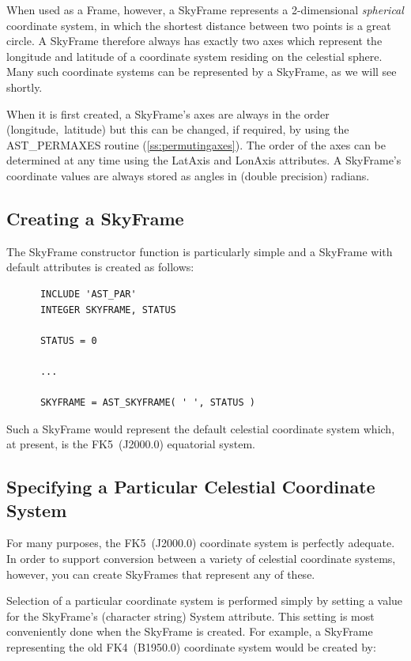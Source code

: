 \documentclass[twoside,11pt]{article}
\newcommand{\htmlref}[2]{#1}
\newcommand{\secref}[1]{\S\ref{#1}}
\renewcommand{\secref}[1]{\ref{#1}}
\begin{document}
When used as a Frame, however, a SkyFrame represents a 2-dimensional
{\em{spherical}} coordinate system, in which the shortest distance
between two points is a great circle.  A SkyFrame therefore always has
exactly two axes which represent the longitude and latitude of a
coordinate system residing on the celestial sphere. Many such
coordinate systems can be represented by a SkyFrame, as we will see
shortly.

When it is first created, a SkyFrame's axes are always in the order
(longitude,~latitude) but this can be changed, if required, by using the
\htmlref{AST\_PERMAXES}{AST_PERMAXES} routine (\secref{ss:permutingaxes}). The order of the axes
can be determined at any time using the \htmlref{LatAxis}{LatAxis} and \htmlref{LonAxis}{LonAxis} attributes. A
SkyFrame's coordinate values are always stored as angles in (double
precision) radians.

\subsection{Creating a SkyFrame}

The \htmlref{SkyFrame}{SkyFrame} constructor function is particularly simple and a
SkyFrame with default attributes is created as follows:

\small
\begin{verbatim}
      INCLUDE 'AST_PAR'
      INTEGER SKYFRAME, STATUS

      STATUS = 0

      ...

      SKYFRAME = AST_SKYFRAME( ' ', STATUS )
\end{verbatim}
\normalsize

Such a SkyFrame would represent the default celestial coordinate
system which, at present, is the FK5~(J2000.0) equatorial system.

\subsection{Specifying a Particular Celestial Coordinate System}

For many purposes, the FK5~(J2000.0) coordinate system is perfectly
adequate. In order to support conversion between a variety of
celestial coordinate systems, however, you can create SkyFrames that
represent any of these.

Selection of a particular coordinate system is performed simply by
setting a value for the \htmlref{SkyFrame}{SkyFrame}'s (character string) \htmlref{System}{System}
attribute. This setting is most conveniently done when the SkyFrame is
created. For example, a SkyFrame representing the old FK4~(B1950.0)
coordinate system would be created by:
\end{document}
